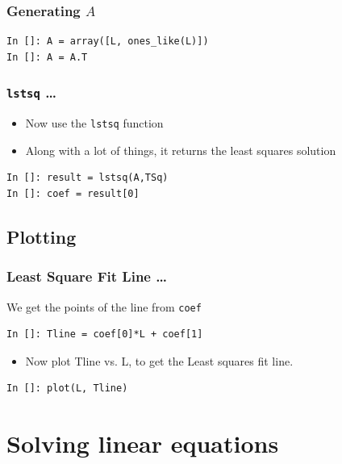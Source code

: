 \documentclass[14pt,compress]{beamer}
\newcommand{\typ}[1]{\lstinline{#1}}
\begin{document}
\begin{frame}[fragile]
\frametitle{Generating $A$}
\begin{lstlisting}
In []: A = array([L, ones_like(L)])
In []: A = A.T
\end{lstlisting}
\end{frame}

\begin{frame}[fragile]
\frametitle{\typ{lstsq} \ldots}
\begin{itemize}
\item Now use the \typ{lstsq} function
\item Along with a lot of things, it returns the least squares solution
\end{itemize}
\begin{lstlisting}
In []: result = lstsq(A,TSq)
In []: coef = result[0]
\end{lstlisting}
\end{frame}

\subsection{Plotting}
\begin{frame}[fragile]
\frametitle{Least Square Fit Line \ldots}
We get the points of the line from \typ{coef}
\begin{lstlisting}
In []: Tline = coef[0]*L + coef[1]
\end{lstlisting}
\begin{itemize}
\item Now plot Tline vs. L, to get the Least squares fit line. 
\end{itemize}
\begin{lstlisting}
In []: plot(L, Tline)
\end{lstlisting}
\end{frame}

\section{Solving linear equations}
\end{document}
